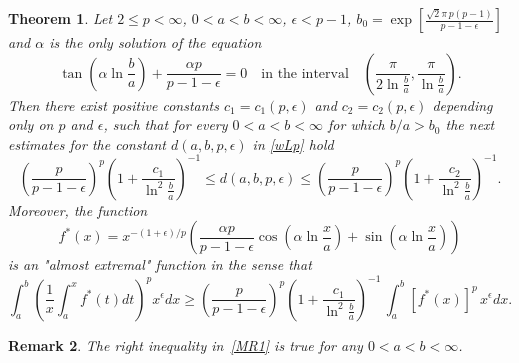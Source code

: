 \documentclass[10pt,a4paper]{amsart}
\newtheorem{theorem}{Theorem}[section]
\newtheorem{remark}[theorem]{Remark}
\numberwithin{equation}{section}
\begin{document}
\begin{theorem}\label{th1}
Let $2\le p<\infty$, $0<a<b<\infty$,  $\epsilon< p-1$,  %
$b_0=\exp\left[\frac{\sqrt2 \pi\,p(p-1)}{p-1-\epsilon} \right]$
and $\alpha$ is the only solution of the equation
\[
\tan\left(\alpha\ln \frac{b}{a} \right)+\frac{\alpha p}{p-1-\epsilon}=0\quad\mbox{in the interval}\quad
\left(\frac{\pi}{2\ln \frac{b}{a}},\frac{\pi}{\ln \frac{b}{a}} \right).
\]
 Then there exist positive constants $c_1=c_1(p,\epsilon)$ and  $c_2=c_2(p,\epsilon)$ 
depending only on $p$ and $\epsilon$, %
  such that  for every $0<a<b<\infty$ for which $b/a>b_0$ the next estimates
for the constant $d(a,b,p,\epsilon)$ in \eqref{wLp} hold 
\begin{equation}\label{MR1}
\left(\frac{p}{p-1-\epsilon} \right)^p  \left(1+\frac{c_1}{\ln^2 \frac{b}{a}}\right)^{-1}\!\!
\le d(a,b,p,\epsilon)
\le \left(\frac{p}{p-1-\epsilon} \right)^p  \left(1+\frac{c_2}{\ln^2 \frac{b}{a}}\right)^{-1}\!\!.
\end{equation}
Moreover, the function 
\begin{equation}\label{fun}
f^\ast(x)=x^{-(1+\epsilon)/p}\left(\frac{\alpha p}{p-1-\epsilon} \cos\left(\alpha\ln \frac{x}{a}\right)+\sin\left(\alpha\ln  \frac{x}{a}\right)\right)
\end{equation}
is an "almost extremal" function in the sense that 
\begin{equation*}
\int_a^b\left(\frac{1}{x}\int_a^x f^\ast(t)dt\right)^px^{\epsilon}dx
\geq \left(\frac{p}{p-1-\epsilon} \right)^p  \left(1+\frac{c_1}{\ln^2 \frac{b}{a}}\right)^{-1}\,\int_a^b [f^\ast(x)]^p \,x^{\epsilon}dx.
\end{equation*}
\end{theorem}
\begin{remark}
The right inequality in~\eqref{MR1} is true for any $0<a<b<\infty$.
\end{remark}
\end{document}
